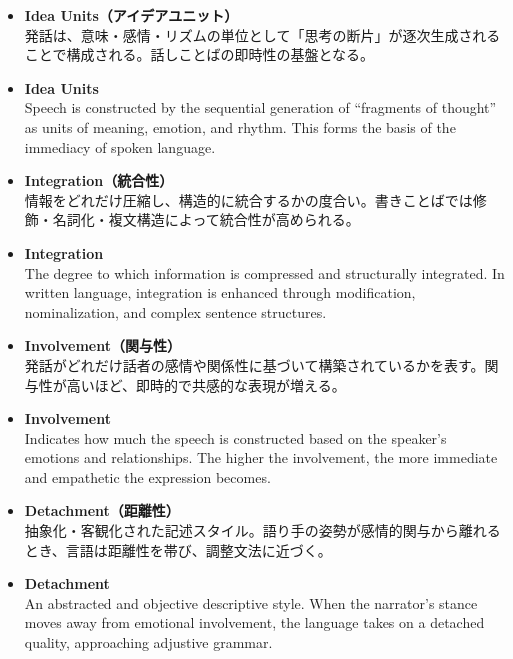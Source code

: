\begin{itemize}
\ifJPN
  \item \textbf{Idea Units（アイデアユニット）} \\ 発話は、意味・感情・リズムの単位として「思考の断片」が逐次生成されることで構成される。話しことばの即時性の基盤となる。
\else
  \item \textbf{Idea Units} \\ Speech is constructed by the sequential generation of ``fragments of thought'' as units of meaning, emotion, and rhythm. This forms the basis of the immediacy of spoken language.
\fi

\ifJPN
  \item \textbf{Integration（統合性）} \\ 情報をどれだけ圧縮し、構造的に統合するかの度合い。書きことばでは修飾・名詞化・複文構造によって統合性が高められる。
\else
\item \textbf{Integration} \\ The degree to which information is compressed and structurally integrated. In written language, integration is enhanced through modification, nominalization, and complex sentence structures.
\fi

\ifJPN
  \item \textbf{Involvement（関与性）} \\ 発話がどれだけ話者の感情や関係性に基づいて構築されているかを表す。関与性が高いほど、即時的で共感的な表現が増える。
\else
  \item \textbf{Involvement} \\ Indicates how much the speech is constructed based on the speaker's emotions and relationships. The higher the involvement, the more immediate and empathetic the expression becomes.
\fi

\ifJPN
  \item \textbf{Detachment（距離性）} \\ 抽象化・客観化された記述スタイル。語り手の姿勢が感情的関与から離れるとき、言語は距離性を帯び、調整文法に近づく。
\else
  \item \textbf{Detachment} \\ An abstracted and objective descriptive style. When the narrator's stance moves away from emotional involvement, the language takes on a detached quality, approaching adjustive grammar.
\fi

\end{itemize}

